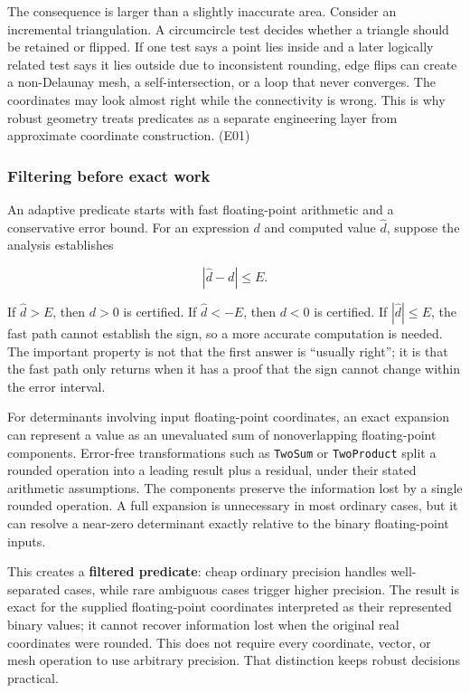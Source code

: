 The consequence is larger than a slightly inaccurate area. Consider an incremental triangulation. A circumcircle test decides whether a triangle should be retained or flipped. If one test says a point lies inside and a later logically related test says it lies outside due to inconsistent rounding, edge flips can create a non-Delaunay mesh, a self-intersection, or a loop that never converges. The coordinates may look almost right while the connectivity is wrong. This is why robust geometry treats predicates as a separate engineering layer from approximate coordinate construction. (E01)

\subsubsection{Filtering before exact work}\label{filtering-before-exact-work}

An adaptive predicate starts with fast floating-point arithmetic and a conservative error bound. For an expression \(d\) and computed value \(\widehat d\), suppose the analysis establishes

\[
|\widehat d-d|\le E.
\]

If \(\widehat d>E\), then \(d>0\) is certified. If \(\widehat d<-E\), then \(d<0\) is certified. If \(|\widehat d|\le E\), the fast path cannot establish the sign, so a more accurate computation is needed. The important property is not that the first answer is ``usually right''; it is that the fast path only returns when it has a proof that the sign cannot change within the error interval.

For determinants involving input floating-point coordinates, an exact expansion can represent a value as an unevaluated sum of nonoverlapping floating-point components. Error-free transformations such as \texttt{TwoSum} or \texttt{TwoProduct} split a rounded operation into a leading result plus a residual, under their stated arithmetic assumptions. The components preserve the information lost by a single rounded operation. A full expansion is unnecessary in most ordinary cases, but it can resolve a near-zero determinant exactly relative to the binary floating-point inputs.

This creates a \textbf{filtered predicate}: cheap ordinary precision handles well-separated cases, while rare ambiguous cases trigger higher precision. The result is exact for the supplied floating-point coordinates interpreted as their represented binary values; it cannot recover information lost when the original real coordinates were rounded. This does not require every coordinate, vector, or mesh operation to use arbitrary precision. That distinction keeps robust decisions practical.

